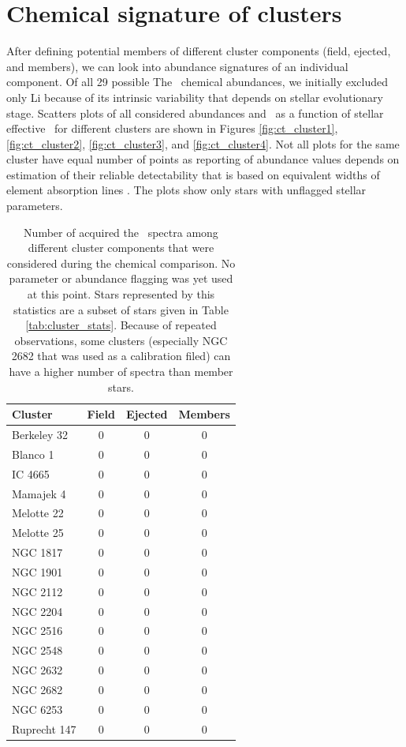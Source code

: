 \section{Chemical signature of clusters}
\label{sec:chem_cluster}
After defining potential members of different cluster components (field, ejected, and members), we can look into abundance signatures of an individual component. Of all 29 possible The \Gh\ chemical abundances, we initially excluded only Li because of its intrinsic variability that depends on stellar evolutionary stage. Scatters plots of all considered abundances and \Feh\ as a function of stellar effective \Teff\ for different clusters are shown in Figures \ref{fig:ct_cluster1}, \ref{fig:ct_cluster2}, \ref{fig:ct_cluster3}, and \ref{fig:ct_cluster4}. Not all plots for the same cluster have equal number of points as reporting of abundance values depends on estimation of their reliable detectability that is based on equivalent widths of element absorption lines \citep[thoroughly described in][]{buder2020}. The plots show only stars with unflagged \citep[\texttt{flag\_sp} = 0, described in][]{buder2020} stellar parameters. 

\begin{table}
	\centering
	\caption{Number of acquired the \Gh\ spectra among different cluster components that were considered during the chemical comparison. No parameter or abundance flagging was yet used at this point. Stars represented by this statistics are a subset of stars given in Table \ref{tab:cluster_stats}. Because of repeated observations, some clusters (especially NGC 2682 that was used as a calibration filed) can have a higher number of spectra than member stars.}
	\begin{tabular}{l | c | c | c }
		\hline
		Cluster & Field & Ejected & Members \\
		\hline
		Berkeley 32  & 0 & 0 & 0 \\ 
		Blanco 1     & 0 & 0 & 0 \\
		IC 4665      & 0 & 0 & 0 \\
		Mamajek 4    & 0 & 0 & 0 \\
		Melotte 22   & 0 & 0 & 0 \\
		Melotte 25   & 0 & 0 & 0 \\
		NGC 1817     & 0 & 0 & 0 \\
		NGC 1901     & 0 & 0 & 0 \\
		NGC 2112     & 0 & 0 & 0 \\
		NGC 2204     & 0 & 0 & 0 \\
		NGC 2516     & 0 & 0 & 0 \\
		NGC 2548     & 0 & 0 & 0 \\
		NGC 2632     & 0 & 0 & 0 \\
		NGC 2682     & 0 & 0 & 0 \\
		NGC 6253     & 0 & 0 & 0 \\
		Ruprecht 147 & 0 & 0 & 0 \\
		\hline
	\end{tabular}
	\label{tab:cluster_stats_abund}
\end{table}

